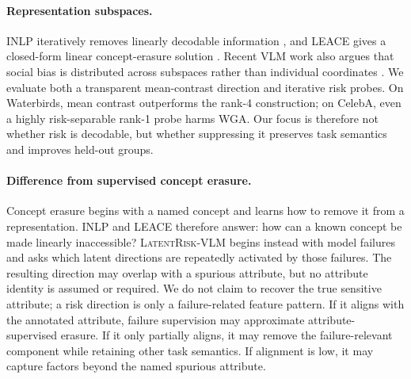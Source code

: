 \paragraph{Representation subspaces.}
INLP iteratively removes linearly decodable information \citep{ravfogel2020inlp}, and LEACE gives a closed-form linear concept-erasure solution \citep{belrose2023leace}. Recent VLM work also argues that social bias is distributed across subspaces rather than individual coordinates \citep{zhao2026subspace}. We evaluate both a transparent mean-contrast direction and iterative risk probes. On Waterbirds, mean contrast outperforms the rank-4 construction; on CelebA, even a highly risk-separable rank-1 probe harms WGA. Our focus is therefore not whether risk is decodable, but whether suppressing it preserves task semantics and improves held-out groups.

\paragraph{Difference from supervised concept erasure.}
Concept erasure begins with a named concept and learns how to remove it from a representation. INLP and LEACE therefore answer: how can a known concept be made linearly inaccessible? \textsc{LatentRisk-VLM} begins instead with model failures and asks which latent directions are repeatedly activated by those failures. The resulting direction may overlap with a spurious attribute, but no attribute identity is assumed or required. We do not claim to recover the true sensitive attribute; a risk direction is only a failure-related feature pattern. If it aligns with the annotated attribute, failure supervision may approximate attribute-supervised erasure. If it only partially aligns, it may remove the failure-relevant component while retaining other task semantics. If alignment is low, it may capture factors beyond the named spurious attribute.
